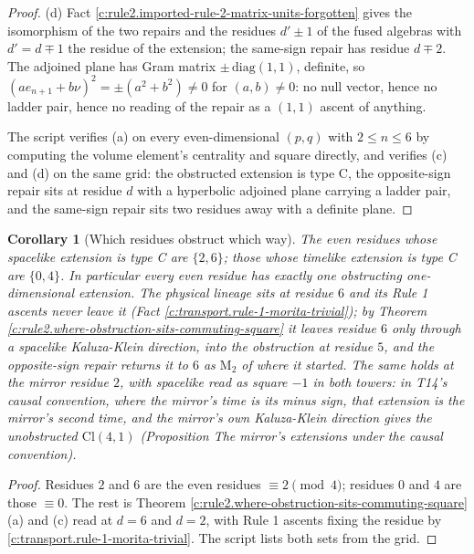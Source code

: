 \documentclass[11pt]{article}
\newtheorem{corollary}[theorem]{Corollary}
\theoremstyle{definition}
\theoremstyle{plain}
\providecommand{\Cl}{}\renewcommand{\Cl}{\mathrm{Cl}}
\providecommand{\Mat}{}\renewcommand{\Mat}{\mathrm{M}}
\begin{document}
\begin{proof}
(d) Fact \ref{c:rule2.imported-rule-2-matrix-units-forgotten} gives the isomorphism of the two repairs and the residues $d' \pm 1$ of the fused algebras with $d' = d \mp 1$ the residue of the extension; the same-sign repair has residue $d \mp 2$. The adjoined plane has Gram matrix $\pm\,\mathrm{diag}(1,1)$, definite, so $(a e_{n+1} + b\nu)^2 = \pm(a^2 + b^2) \neq 0$ for $(a,b) \neq 0$: no null vector, hence no ladder pair, hence no reading of the repair as a $(1,1)$ ascent of anything.

The script verifies (a) on every even-dimensional $(p,q)$ with $2 \leq n \leq 6$ by computing the volume element's centrality and square directly, and verifies (c) and (d) on the same grid: the obstructed extension is type C, the opposite-sign repair sits at residue $d$ with a hyperbolic adjoined plane carrying a ladder pair, and the same-sign repair sits two residues away with a definite plane.

\end{proof}

\begin{corollary}[Which residues obstruct which way]\label{c:rule2.which-residues-obstruct-which-way}
The even residues whose spacelike extension is type C are $\{2, 6\}$; those whose timelike extension is type C are $\{0, 4\}$. In particular every even residue has exactly one obstructing one-dimensional extension. The physical lineage sits at residue $6$ and its Rule 1 ascents never leave it (Fact \ref{c:transport.rule-1-morita-trivial}); by Theorem \ref{c:rule2.where-obstruction-sits-commuting-square} it leaves residue $6$ only through a spacelike Kaluza-Klein direction, into the obstruction at residue $5$, and the opposite-sign repair returns it to $6$ as $\Mat_2$ of where it started. The same holds at the mirror residue $2$, with spacelike read as square $-1$ in both towers: in T14's causal convention, where the mirror's time is its minus sign, that extension is the mirror's second time, and the mirror's own Kaluza-Klein direction gives the unobstructed $\Cl(4,1)$ (Proposition \emph{The mirror's extensions under the causal convention}).
\end{corollary}
\begin{proof}
Residues $2$ and $6$ are the even residues $\equiv 2 \pmod 4$; residues $0$ and $4$ are those $\equiv 0$. The rest is Theorem \ref{c:rule2.where-obstruction-sits-commuting-square}(a) and (c) read at $d = 6$ and $d = 2$, with Rule 1 ascents fixing the residue by \ref{c:transport.rule-1-morita-trivial}. The script lists both sets from the grid.

\end{proof}
\end{document}
